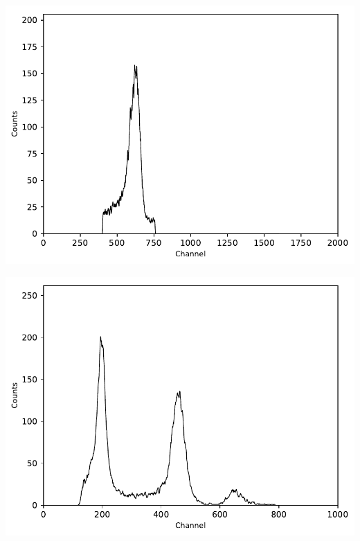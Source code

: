 \begin{multicols}{2}
\begin{center}
\begin{adjustbox}{max width=\linewidth, keepaspectratio}
        \end{adjustbox}
        \label{fig:137CsTPHC60ns}
    \end{center}
\endminipage
%
\vspace{10mm}
%
\minipage{\linewidth}
    \begin{center}
        \captionsetup{type=figure}
        \begin{adjustbox}{max width=\linewidth, keepaspectratio}
            \includegraphics[]{pdf/137CsTPHC_geschnitten_neu}
        \end{adjustbox}
        \label{fig:137CsTPHC_geschnitten_neu}
    \end{center}
\endminipage
%
\vspace{10mm}
%
\minipage{\linewidth}
    \begin{center}
        \captionsetup{type=figure}
        \begin{adjustbox}{max width=\linewidth, keepaspectratio}
            \includegraphics[]{pdf/137CsmitTPHC_gated}

\end{adjustbox}
\end{center}
\end{multicols}
